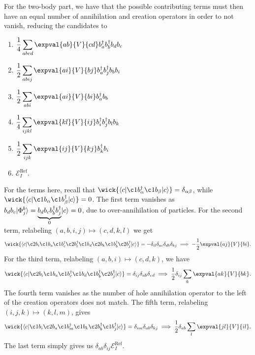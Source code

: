 For the two-body part, we have that the possible contributing terms must then have an equal number of annihilation and creation operators in order to not vanish, reducing the candidates to
\begin{multicols}{2}{}
    \begin{enumerate}
        \item  $\displaystyle\frac{1}{4} \sum_{abcd} \expval{ab}{V}{cd} b_a^\dagger b_b^\dagger b_d b_c$
        \item  $\displaystyle\frac{1}{2} \sum_{abij} \expval{ai}{V}{bj} b_a^\dagger b_j^\dagger b_b b_i$
        \item  $\displaystyle\frac{1}{2} \sum_{abi} \expval{ai}{V}{bi} b_a^\dagger b_b$
        \item  $\displaystyle\frac{1}{4} \sum_{ijkl} \expval{kl}{V}{ij} b_i^\dagger b_j^\dagger b_l b_k$
        \item  $\displaystyle\frac{1}{2} \sum_{ijk} \expval{ij}{V}{kj} b_k^\dagger b_i$
        \item  $\displaystyle\mathcal{E}_I^\text{Ref}$.
    \end{enumerate}
\end{multicols}

For the terms here, recall that $\wick{\langle c \vert \c1 b_\alpha^\dagger \c1 b_\beta \vert c \rangle} = \delta_{\alpha \beta}$, while $\wick{\langle c \vert \c1 b_\alpha \c1 b_\beta^\dagger \vert c \rangle} = 0$.
The first term vanishes as $b_d b_c\lvert\Phi_j^{b}\rangle =  \underbrace{b_d b_c b_b^\dagger b_j^\dagger}_{0}\lvert c\rangle= 0$, due to over-annihilation of particles.
For the second term, relabeling $(a, b, i, j) \mapsto (c, d, k, l)$ we get
\begin{equation*}
    \wick{
        \langle
        c \vert
        \c2 b_i
        \c1 b_a
        \c1 b_c^\dagger
        \c2 b_l^\dagger
        \c1 b_d
        \c2 b_k
        \c1 b_b^\dagger
        \c2 b_j^\dagger
        \vert c
        \rangle
    } = -\delta_{il} \delta_{ac} \delta_{db} \delta_{kj} \implies
    -\frac{1}{2} \expval{a j}{V}{b i}.
\end{equation*}
For the third term, relabeling $(a, b, i) \mapsto (c, d, k)$, we have
\begin{equation*}
    \wick{
        \langle
        c \vert
        \c2 b_i
        \c1 b_a
        \c1 b_c^\dagger
        \c1 b_d
        \c1 b_b^\dagger
        \c2 b_j^\dagger
        \vert c
        \rangle
    } = \delta_{ij} \delta_{ab} \delta_{cd} \implies
    \frac{1}{2} \delta_{ij} \sum_{k} \expval{a k}{V}{b k}.
\end{equation*}
The fourth term vanishes as the number of hole annihilation operator to the left of the creation operators does not match.
The fifth term, relabeling $(i, j, k) \mapsto (k, l, m)$, gives
\begin{equation*}
    \wick{
        \langle
        c \vert
        \c1 b_i
        \c2 b_a
        \c1 b_m^\dagger
        \c1 b_k
        \c2 b_b^\dagger
        \c1 b_j^\dagger
        \vert c
        \rangle
    } = \delta_{im} \delta_{ab} \delta_{kj} \implies
    \frac{1}{2} \delta_{ab} \sum_{l} \expval{j l}{V}{i l}.
\end{equation*}
The last term simply gives us $\delta_{ab} \delta_{ij} \mathcal{E}_I^{\text{Ref}}$.

